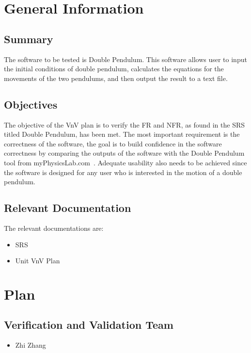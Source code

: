 \documentclass[12pt, titlepage]{article}
\begin{document}
\section{General Information}\label{sec_generalInfo}

\subsection{Summary}

The software to be tested is Double Pendulum. This software allows user to input
the initial conditions of double pendulum, calculates the equations for the
movements of the two pendulums, and then output the result to a text file.

\subsection{Objectives}

The objective of the VnV plan is to verify the FR and NFR, as found in the SRS
titled Double Pendulum, has been met. The most important requirement is the
correctness of the software, the goal is to build confidence in the software
correctness by comparing the outputs of the software with the Double Pendulum
tool from myPhysicsLab.com~\cite{Double_Pendulum}. Adequate usability also needs
to be achieved since the software is designed for any user who is interested in
the motion of a double pendulum.
 
\subsection{Relevant Documentation}

The relevant documentations are:
\begin{itemize}
    \item SRS
    \item Unit VnV Plan
\end{itemize}

\section{Plan}\label{sec_Plan}
	

\subsection{Verification and Validation Team}

\begin{itemize}
    \item Zhi Zhang
\end{itemize}
\end{document}
